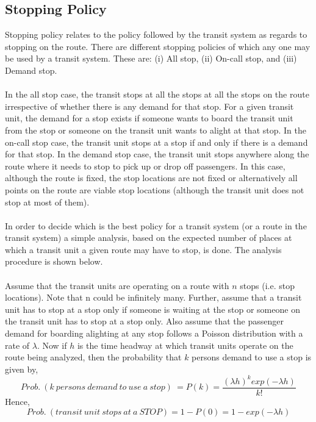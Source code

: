 \subsection{Stopping Policy}
Stopping policy relates to the policy followed by the transit system as regards to stopping on the route. There are different stopping policies of which any one may be used by a transit system. These are: (i) All stop, (ii) On-call stop, and (iii) Demand stop.\\\\
In the all stop case, the transit stops at all the stops at all the stops on the route irrespective of whether there is any demand for that stop. For a given transit unit, the demand for a stop exists if someone wants to board the transit unit from the stop or someone on the transit unit wants to alight at that stop. In the on-call stop case, the transit unit stops at a stop if and only if there is a demand for that stop. In the demand stop case, the transit unit stops anywhere along the route where it needs to stop to pick up or drop off passengers. In this case, although the route is fixed, the stop locations are not fixed or alternatively all points on the route are viable stop locations (although the transit unit does not stop at most of them).\\\\
In order to decide which is the best policy for a transit system (or a route in the transit system) a simple analysis, based on the expected number of places at which a transit unit a given route may have to stop, is done. The analysis procedure is shown below.\\\\
Assume that the transit units are operating on a route with $ n $ stops (i.e. stop locations). Note that n could be infinitely many. Further, assume that a transit unit has to stop at a stop only if someone is waiting at the stop or someone on the transit unit has to stop at a stop only. Also assume that the passenger demand for boarding alighting at any stop follows a Poisson distribution with a rate of $\lambda$. Now if $h$ is the time headway at which transit units operate on the route being analyzed, then the probability that $k$ persons demand to use a stop is given by,
\begin{equation}
	Prob. \: (k \: persons \: demand \: to \: use \: a \: stop)\: = P(k) = \frac{(\lambda h)^k exp(- \lambda h)}{k !}
\end{equation}
Hence,
\begin{equation}
	Prob.\: (transit \: unit \: stops \: at \: a \: STOP) = 1 - P(0) = 1 - exp(- \lambda h)
\end{equation}
